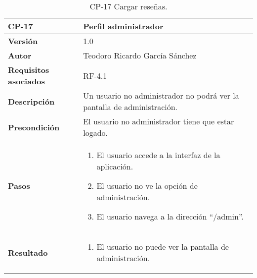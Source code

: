 \begin{table}[p]
	\centering
	\begin{tabularx}{\linewidth}{ p{} p{} }
		\toprule
		\textbf{CP-17}    & \textbf{Perfil administrador}\\
		\toprule
		\textbf{Versión}              & 1.0    \\
		\textbf{Autor}                & Teodoro Ricardo García Sánchez \\
		\textbf{Requisitos asociados} & RF-4.1 \\
		\textbf{Descripción}          & Un usuario no administrador no podrá ver la pantalla de administración. \\
		\textbf{Precondición}         & El usuario no administrador tiene que estar logado. \\
		\textbf{Pasos}             &
		\begin{enumerate}
			\def\labelenumi{\arabic{enumi}.}
			\tightlist
			\item El usuario accede a la interfaz de la aplicación.
			\item El usuario no ve la opción de administración.
			\item El usuario navega a la dirección ``/admin''.
		\end{enumerate}\\
		\textbf{Resultado}          & 
		\begin{enumerate}
			\item El usuario no puede ver la pantalla de administración.
		\end{enumerate}\\
		\bottomrule
	\end{tabularx}
	\caption{CP-17 Cargar reseñas.}
\end{table}

